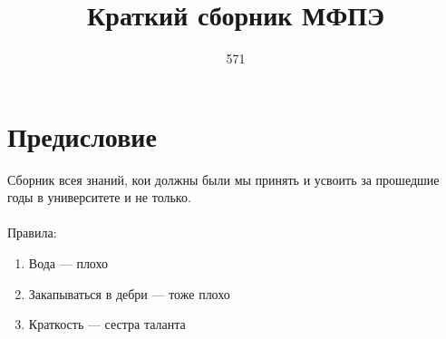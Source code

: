 \documentclass[draft]{article}
\title{Краткий сборник МФПЭ}
\author{571}
\begin{document}
\maketitle
\setcounter{secnumdepth}{-1}
\tableofcontents

\section{Предисловие}
Сборник всея знаний, кои должны были мы принять и усвоить за прошедшие годы в университете и не только.\\\\
Правила:
\begin{enumerate}
    \item Вода --- плохо
    \item Закапываться в дебри --- тоже плохо
    \item Краткость --- сестра таланта
\end{enumerate}


\clearpage

\clearpage

\clearpage

\end{document}
